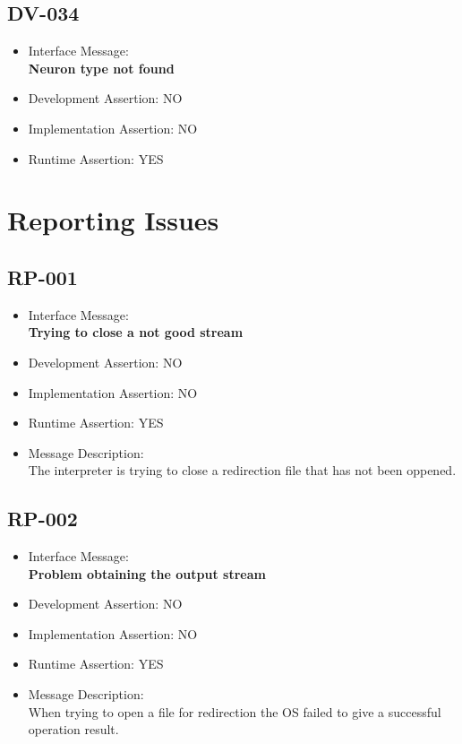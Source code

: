 \subsection{DV-034}
\begin{itemize}
  \item Interface Message:\\[1em]
    \textbf{Neuron type not found}
  \item Development Assertion: NO
  \item Implementation Assertion: NO
  \item Runtime Assertion: YES
\end{itemize}

\section{Reporting Issues}

\subsection{RP-001}
\begin{itemize}
  \item Interface Message:\\[1em]
    \textbf{Trying to close a not good stream}
  \item Development Assertion: NO
  \item Implementation Assertion: NO
  \item Runtime Assertion: YES
  \item Message Description:\\[1em]
    The interpreter is trying to close a redirection file that has not been oppened.
\end{itemize}

\subsection{RP-002}
\begin{itemize}
  \item Interface Message:\\[1em]
    \textbf{Problem obtaining the output stream}
  \item Development Assertion: NO
  \item Implementation Assertion: NO
  \item Runtime Assertion: YES
  \item Message Description:\\[1em]
    When trying to open a file for redirection the OS failed to give a successful operation result.
\end{itemize}

